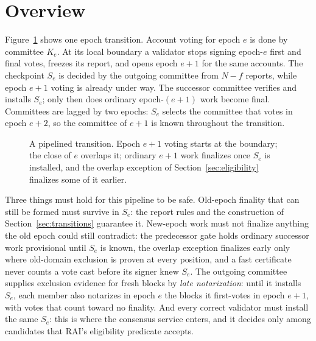 \section{Overview}
\label{sec:overview}
Figure~\ref{fig:pipeline} shows one epoch transition. Account voting for epoch $e$ is done by committee $K_e$. At its local boundary a validator stops signing epoch-$e$ first and final votes, freezes its report, and opens epoch $e+1$ for the same accounts. The checkpoint $S_e$ is decided by the outgoing committee from $N-f$ reports, while epoch $e+1$ voting is already under way. The successor committee verifies and installs $S_e$; only then does ordinary epoch-$(e+1)$ work become final. Committees are lagged by two epochs: $S_e$ selects the committee that votes in epoch $e+2$, so the committee of $e+1$ is known throughout the transition.

\begin{figure}[t]
\centering
{}
\caption{A pipelined transition. Epoch $e+1$ voting starts at the boundary; the close of $e$ overlaps it; ordinary $e+1$ work finalizes once $S_e$ is installed, and the overlap exception of Section~\ref{sec:eligibility} finalizes some of it earlier.}
\label{fig:pipeline}
\end{figure}

Three things must hold for this pipeline to be safe. Old-epoch finality that can still be formed must survive in $S_e$: the report rules and the construction of Section~\ref{sec:transitions} guarantee it. New-epoch work must not finalize anything the old epoch could still contradict: the predecessor gate holds ordinary successor work provisional until $S_e$ is known, the overlap exception finalizes early only where old-domain exclusion is proven at every position, and a fast certificate never counts a vote cast before its signer knew $S_e$. The outgoing committee supplies exclusion evidence for fresh blocks by \emph{late notarization}: until it installs $S_e$, each member also notarizes in epoch $e$ the blocks it first-votes in epoch $e+1$, with votes that count toward no finality. And every correct validator must install the same $S_e$: this is where the consensus service enters, and it decides only among candidates that RAI's eligibility predicate accepts.

